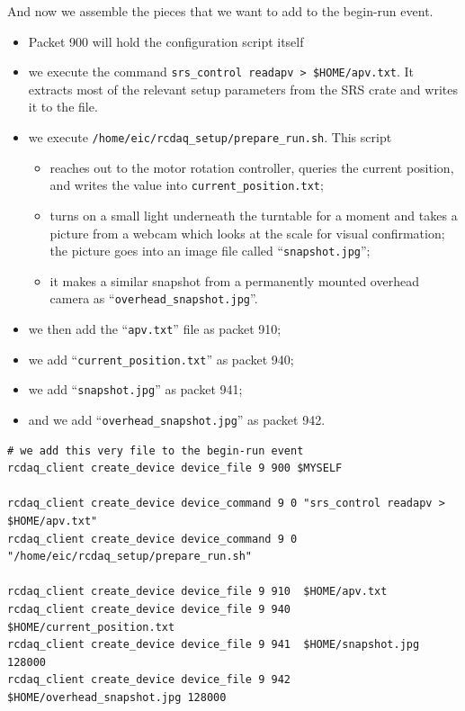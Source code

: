 \documentclass{article}[11pt]
\begin{document}
And now we assemble the pieces that we want to add to the begin-run event. 
\begin{itemize}
\item Packet 900 will hold the configuration script itself
\item we execute the command \verb|srs_control readapv > $HOME/apv.txt|. It extracts 
most of the relevant setup parameters from the SRS crate and writes it to the file.
\item we execute  \verb|/home/eic/rcdaq_setup/prepare_run.sh|. This script 

\begin{itemize} 
\item reaches out to the motor rotation controller, queries the current
  position, and writes the value into \verb|current_position.txt|;
\item turns on a small light underneath the turntable for a moment and
 takes a picture from a webcam which looks at the scale for visual confirmation; the picture goes into an image file called
``\verb|snapshot.jpg|'';
\item it makes a similar snapshot from a permanently mounted overhead camera as ``\verb|overhead_snapshot.jpg|''.
\end{itemize}

\item we then add the ``\verb|apv.txt|'' file as packet 910;
\item we add ``\verb|current_position.txt|'' as packet 940; 
\item we add ``\verb|snapshot.jpg|'' as packet 941;
\item and we add ``\verb|overhead_snapshot.jpg|'' as packet 942.
\end{itemize}

\begin{verbatim} 
# we add this very file to the begin-run event
rcdaq_client create_device device_file 9 900 $MYSELF

rcdaq_client create_device device_command 9 0 "srs_control readapv > $HOME/apv.txt"
rcdaq_client create_device device_command 9 0 "/home/eic/rcdaq_setup/prepare_run.sh"

rcdaq_client create_device device_file 9 910  $HOME/apv.txt
rcdaq_client create_device device_file 9 940  $HOME/current_position.txt
rcdaq_client create_device device_file 9 941  $HOME/snapshot.jpg 128000
rcdaq_client create_device device_file 9 942  $HOME/overhead_snapshot.jpg 128000
\end{verbatim} 
\end{document}
